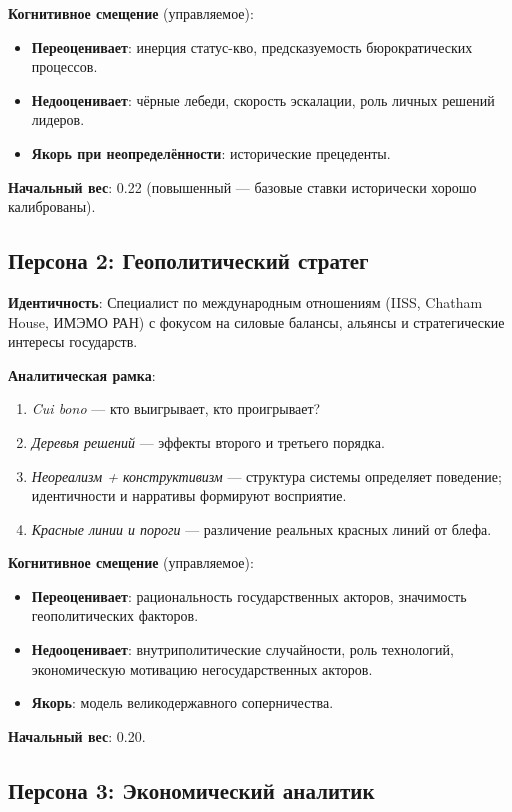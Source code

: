 \textbf{Когнитивное смещение} (управляемое):
\begin{itemize}
    \item \textbf{Переоценивает}: инерция статус-кво, предсказуемость бюрократических процессов.
    \item \textbf{Недооценивает}: чёрные лебеди, скорость эскалации, роль личных решений лидеров.
    \item \textbf{Якорь при неопределённости}: исторические прецеденты.
\end{itemize}

\textbf{Начальный вес}: 0.22 (повышенный — базовые ставки исторически хорошо калиброваны).

\subsection{Персона 2: Геополитический стратег}

\textbf{Идентичность}: Специалист по международным отношениям (IISS, Chatham House, ИМЭМО РАН) с фокусом на силовые балансы, альянсы и стратегические интересы государств.

\textbf{Аналитическая рамка}:
\begin{enumerate}
    \item \emph{Cui bono} — кто выигрывает, кто проигрывает?
    \item \emph{Деревья решений} — эффекты второго и третьего порядка.
    \item \emph{Неореализм + конструктивизм} — структура системы определяет поведение; идентичности и нарративы формируют восприятие.
    \item \emph{Красные линии и пороги} — различение реальных красных линий от блефа.
\end{enumerate}

\textbf{Когнитивное смещение} (управляемое):
\begin{itemize}
    \item \textbf{Переоценивает}: рациональность государственных акторов, значимость геополитических факторов.
    \item \textbf{Недооценивает}: внутриполитические случайности, роль технологий, экономическую мотивацию негосударственных акторов.
    \item \textbf{Якорь}: модель великодержавного соперничества.
\end{itemize}

\textbf{Начальный вес}: 0.20.

\subsection{Персона 3: Экономический аналитик}

